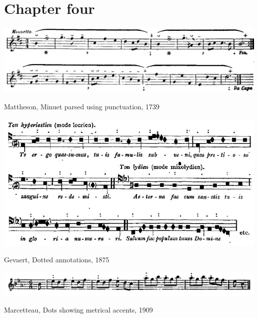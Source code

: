 \clearpage
\section{Chapter four}

%
%

\vspace*{\fill}

\begin{example}
  \centering
  \includegraphics[width=\linewidth]{c/3/ex/lussy-mattheson.png}
  \caption{Mattheson, Minuet parsed using punctuation, 1739}
  \label{mus:mattheson}
\end{example}

\vspace*{\fill}

\begin{example}
  \centering
  \includegraphics[width=\linewidth]{c/3/ex/gevaert_dots.jpg}
  \caption{Gevaert, Dotted annotations, 1875}
  \label{mus:gevaert_dots}
\end{example}

\vspace*{\fill}

\begin{example}
  \centering
  \includegraphics[width=\linewidth]{c/3/ex/marcetteau_beethoven.png}
  \caption{Marcetteau, Dots showing metrical accents, 1909}
  \label{mus:marcetteau-dots}
\end{example}

